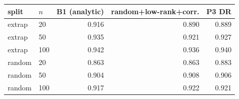 {\scriptsize
\begin{tabular}{llrrr}
\toprule
split & $n$ & B1 (analytic) & random+low-rank+corr. & P3 DR \\
\midrule
extrap & 20 & 0.916 & 0.890 & 0.889 \\
extrap & 50 & 0.935 & 0.921 & 0.927 \\
extrap & 100 & 0.942 & 0.936 & 0.940 \\
random & 20 & 0.863 & 0.863 & 0.883 \\
random & 50 & 0.904 & 0.908 & 0.906 \\
random & 100 & 0.917 & 0.922 & 0.921 \\
\bottomrule
\end{tabular}}
